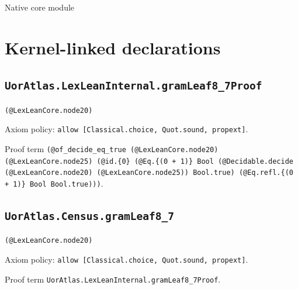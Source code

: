 \documentclass[11pt]{article}
\begin{document}
\begin{center}{\LARGE Native core module}\end{center}
\section*{Kernel-linked declarations}
\subsection*{\texttt{UorAtlas.LexLeanInternal.gramLeaf8\_7Proof}}
\noindent\texttt{(@LexLeanCore.node20)}\par
\noindent Axiom policy: \texttt{allow [Classical.choice, Quot.sound, propext]}.\par
\noindent Proof term \texttt{(@of\_decide\_eq\_true (@LexLeanCore.node20) (@LexLeanCore.node25) (@id.\{0\} (@Eq.\{(0 + 1)\} Bool (@Decidable.decide (@LexLeanCore.node20) (@LexLeanCore.node25)) Bool.true) (@Eq.refl.\{(0 + 1)\} Bool Bool.true)))}.\par
\subsection*{\texttt{UorAtlas.Census.gramLeaf8\_7}}
\noindent\texttt{(@LexLeanCore.node20)}\par
\noindent Axiom policy: \texttt{allow [Classical.choice, Quot.sound, propext]}.\par
\noindent Proof term \texttt{UorAtlas.LexLeanInternal.gramLeaf8\_7Proof}.\par
\end{document}
